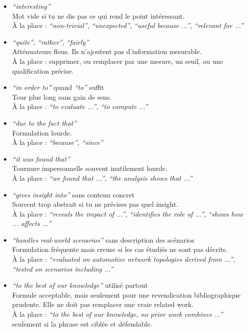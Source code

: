 \documentclass[11pt,a4paper]{article}
\theoremstyle{definition}
\begin{document}
\begin{itemize}
    \item \textit{``interesting''} \\
    Mot vide si tu ne dis pas ce qui rend le point intéressant. \\
    À la place : \textit{``non-trivial''}, \textit{``unexpected''}, \textit{``useful because ...''}, \textit{``relevant for ...''}

    \item \textit{``quite''}, \textit{``rather''}, \textit{``fairly''} \\
    Atténuateurs flous. Ils n'ajoutent pas d'information mesurable. \\
    À la place : supprimer, ou remplacer par une mesure, un seuil, ou une qualification précise.

    \item \textit{``in order to''} quand \textit{``to''} suffit \\
    Tour plus long sans gain de sens. \\
    À la place : \textit{``to evaluate ...''}, \textit{``to compute ...''}

    \item \textit{``due to the fact that''} \\
    Formulation lourde. \\
    À la place : \textit{``because''}, \textit{``since''}

    \item \textit{``it was found that''} \\
    Tournure impersonnelle souvent inutilement lourde. \\
    À la place : \textit{``we found that ...''}, \textit{``the analysis shows that ...''}

    \item \textit{``gives insight into''} sans contenu concret \\
    Souvent trop abstrait si tu ne précises pas quel insight. \\
    À la place : \textit{``reveals the impact of ...''}, \textit{``identifies the role of ...''}, \textit{``shows how ... affects ...''}

    \item \textit{``handles real-world scenarios''} sans description des scénarios \\
    Formulation fréquente mais creuse si les cas étudiés ne sont pas décrits. \\
    À la place : \textit{``evaluated on automotive network topologies derived from ...''}, \textit{``tested on scenarios including ...''}

    \item \textit{``to the best of our knowledge''} utilisé partout \\
    Formule acceptable, mais seulement pour une revendication bibliographique prudente. Elle ne doit pas remplacer une vraie related work. \\
    À la place : \textit{``to the best of our knowledge, no prior work combines ...''} seulement si la phrase est ciblée et défendable.

\end{itemize}
\end{document}
